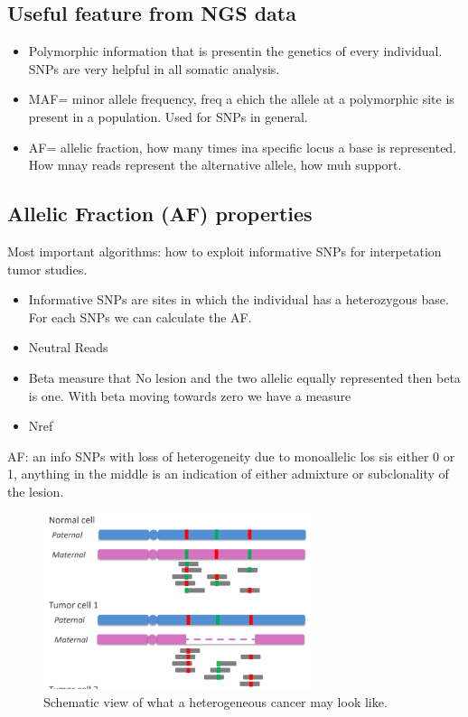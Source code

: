 \subsection{Useful feature from NGS data}
\begin{itemize}
\item Polymorphic information that is presentin the genetics of every individual. SNPs are very helpful in all somatic analysis.
\item MAF= minor allele frequency, freq a ehich the allele at a polymorphic site is present in a population. Used for SNPs in general.
\item AF= allelic fraction, how many times ina specific locus a base is represented. How mnay reads represent the alternative allele, how muh support. 
\end{itemize}

\subsection{Allelic Fraction (AF) properties}
Most important algorithms: how to exploit informative SNPs for interpetation tumor studies.\\

\begin{itemize}
\item Informative SNPs are sites in which the individual has a heterozygous base. For each SNPs we can calculate the AF.
\item Neutral Reads
\item Beta measure that No lesion and the two allelic equally represented then beta is one. With beta moving towards zero we have a measure 
\item Nref
\end{itemize}

AF: an info SNPs with loss of heterogeneity due to monoallelic los sis either 0 or 1, anything in the middle is an indication of either admixture or subclonality of the lesion.

\begin{figure}[htbp!]
	\centering
	\includegraphics[width=0.7\textwidth]{af_properties.png}
	\caption{\label{fig:af_properties} Schematic view of what a heterogeneous cancer may look like.}
\end{figure}

